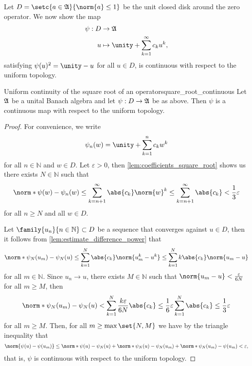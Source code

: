 Let \(D = \setc{a \in \algebra{A}}{\norm{a} \leq 1}\) be the unit closed disk around the zero operator. We now show the map
\begin{align*}
    \psi:D&\to \algebra{A}\\
        u &\mapsto \unity + \sum_{k = 1}^\infty c_k u^k,
\end{align*}
satisfying \(\psi(u)^2 = \unity - u\) for all \(u \in D\), is continuous with respect to the uniform topology.
\begin{proposition}{Uniform continuity of the square root of an operator}{square_root_continuous}
    Let \(\mathfrak{A}\) be a unital Banach algebra and let \(\psi : D \to \mathfrak{A}\) be as above. Then \(\psi\) is a continuous map with respect to the uniform topology.
\end{proposition}
\begin{proof}
    For convenience, we write
    \begin{equation*}
        \psi_n(w) = \unity + \sum_{k = 1}^n c_k w^k
    \end{equation*}
    for all \(n \in \mathbb{N}\) and \(w \in D\). Let \(\varepsilon > 0\), then \cref{lem:coefficients_square_root} shows us there exists \(N \in \mathbb{N}\) such that
    \begin{equation*}
        \norm*{\psi(w) - \psi_n(w)} \leq \sum_{k = n + 1}^\infty \abs{c_k} \norm{w}^k \leq \sum_{k = n + 1}^\infty \abs{c_k} < \frac13\varepsilon
    \end{equation*}
    for all \(n \geq N\) and all \(w \in D\).

    Let \(\family{u_n}{n\in \mathbb{N}} \subset D\) be a sequence that converges against \(u \in D\), then it follows from \cref{lem:estimate_difference_power} that
    \begin{equation*}
        \norm*{\psi_N(u_m) - \psi_N(u)} \leq \sum_{k = 1}^N \abs{c_k} \norm{u_m^k-u^k} \leq \sum_{k = 1}^N k\abs{c_k}\norm{u_m - u}
    \end{equation*}
    for all \(m \in \mathbb{N}\). Since \(u_n \to u\), there exists \(M \in \mathbb{N}\) such that \(\norm{u_m - u} < \frac{\varepsilon}{6N}\) for all \(m \geq M\), then
    \begin{equation*}
        \norm*{\psi_N(u_m) - \psi_N(u)} < \sum_{k = 1}^N \frac{k \varepsilon}{6N} \abs{c_k} \leq \frac16 \varepsilon\sum_{k = 1}^N \abs{c_k} \leq \frac13\varepsilon
    \end{equation*}
    for all \(m \geq M\). Then, for all \(m \geq \max\set{N, M}\) we have by the triangle inequality that
    \begin{equation*}
        \norm{\psi(u) - \psi(u_m)} \leq \norm*{\psi(u) - \psi_N(u)} + \norm*{\psi_N(u) - \psi_N(u_m)} + \norm*{\psi_N(u_m) - \psi(u_m)} < \varepsilon,
    \end{equation*}
    that is, \(\psi\) is continuous with respect to the uniform topology.
\end{proof}
